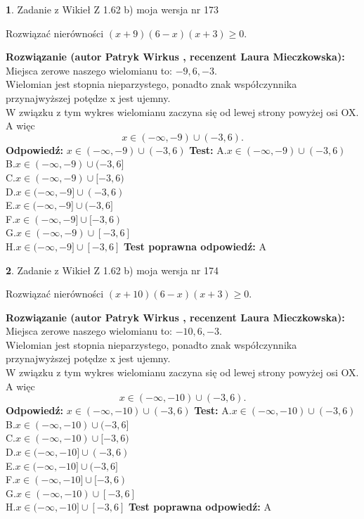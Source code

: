 \documentclass[12pt, a4paper]{article}
\theoremstyle{definition} %
\newtheorem{zad}{}
\newcommand{\zadStart}[1]{\begin{zad}#1\newline}
\newcommand{\zadStop}{\end{zad}}
\newcommand{\rozwStart}[2]{\noindent \textbf{Rozwiązanie (autor #1 , recenzent #2): }\newline}
\newcommand{\rozwStop}{\newline}
\newcommand{\odpStart}{\noindent \textbf{Odpowiedź:}\newline}
\newcommand{\odpStop}{\newline}
\newcommand{\testStart}{\noindent \textbf{Test:}\newline}
\newcommand{\testStop}{\newline}
\newcommand{\kluczStart}{\noindent \textbf{Test poprawna odpowiedź:}\newline}
\newcommand{\kluczStop}{\newline}
\begin{document}
\zadStart{Zadanie z Wikieł Z 1.62 b) moja wersja nr 173}

Rozwiązać nierówności $(x+9)(6-x)(x+3)\ge0$.
\zadStop
\rozwStart{Patryk Wirkus}{Laura Mieczkowska}
Miejsca zerowe naszego wielomianu to: $-9, 6, -3$.\\
Wielomian jest stopnia nieparzystego, ponadto znak współczynnika przy\linebreak najwyższej potędze x jest ujemny.\\ W związku z tym wykres wielomianu zaczyna się od lewej strony powyżej osi OX. A więc $$x \in (-\infty,-9) \cup (-3,6).$$
\rozwStop
\odpStart
$x \in (-\infty,-9) \cup (-3,6)$
\odpStop
\testStart
A.$x \in (-\infty,-9) \cup (-3,6)$\\
B.$x \in (-\infty,-9) \cup (-3,6]$\\
C.$x \in (-\infty,-9) \cup [-3,6)$\\
D.$x \in (-\infty,-9] \cup (-3,6)$\\
E.$x \in (-\infty,-9] \cup (-3,6]$\\
F.$x \in (-\infty,-9] \cup [-3,6)$\\
G.$x \in (-\infty,-9) \cup [-3,6]$\\
H.$x \in (-\infty,-9] \cup [-3,6]$
\testStop
\kluczStart
A
\kluczStop



\zadStart{Zadanie z Wikieł Z 1.62 b) moja wersja nr 174}

Rozwiązać nierówności $(x+10)(6-x)(x+3)\ge0$.
\zadStop
\rozwStart{Patryk Wirkus}{Laura Mieczkowska}
Miejsca zerowe naszego wielomianu to: $-10, 6, -3$.\\
Wielomian jest stopnia nieparzystego, ponadto znak współczynnika przy\linebreak najwyższej potędze x jest ujemny.\\ W związku z tym wykres wielomianu zaczyna się od lewej strony powyżej osi OX. A więc $$x \in (-\infty,-10) \cup (-3,6).$$
\rozwStop
\odpStart
$x \in (-\infty,-10) \cup (-3,6)$
\odpStop
\testStart
A.$x \in (-\infty,-10) \cup (-3,6)$\\
B.$x \in (-\infty,-10) \cup (-3,6]$\\
C.$x \in (-\infty,-10) \cup [-3,6)$\\
D.$x \in (-\infty,-10] \cup (-3,6)$\\
E.$x \in (-\infty,-10] \cup (-3,6]$\\
F.$x \in (-\infty,-10] \cup [-3,6)$\\
G.$x \in (-\infty,-10) \cup [-3,6]$\\
H.$x \in (-\infty,-10] \cup [-3,6]$
\testStop
\kluczStart
A
\kluczStop
\end{document}
